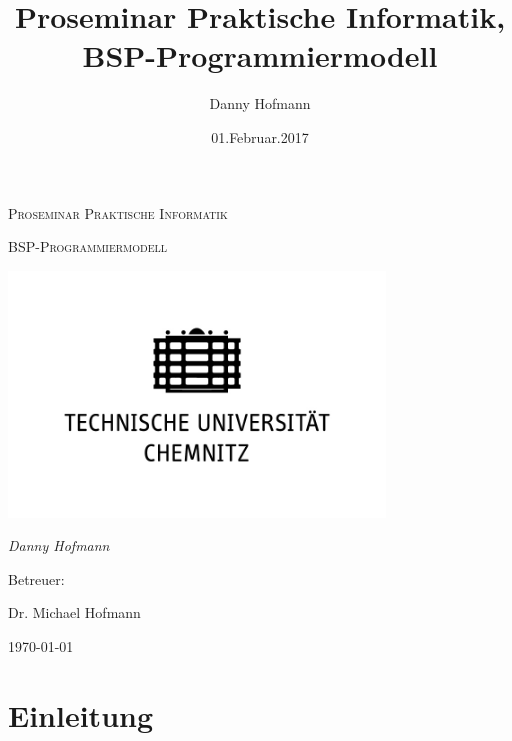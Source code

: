 \documentclass[a4paper,10pt]{scrartcl}
\title{Proseminar Praktische Informatik, BSP-Programmiermodell}
\author{Danny Hofmann}
\date{01.Februar.2017}
\begin{document}
\begin{titlepage}
\centering
{\scshape\Large Proseminar Praktische Informatik\par}
	\vspace{1.5cm}
	{\scshape\Huge BSP-Programmiermodell\par}
	\vspace{1.5cm} 

\includegraphics[width=0.75\textwidth]{TU_Chemnitz_positiv_schwarz}\par\vspace{1cm}
	{\Large\itshape Danny Hofmann\par}
	\vspace{4.0cm}
	Betreuer:\par
	Dr. Michael Hofmann
	\vfill
	{\large \today\par}
\end{titlepage}
\tableofcontents
\newpage

\section{Einleitung}
\end{document}
